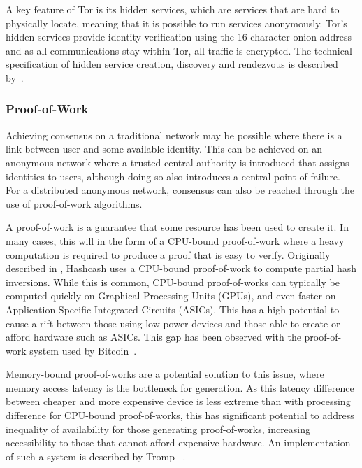 			A key feature of Tor is its hidden services, which are services that are hard to physically locate, meaning that it is possible to run services anonymously. Tor's hidden services provide identity verification using the 16 character onion address and as all communications stay within Tor, all traffic is encrypted. The technical specification of hidden service creation, discovery and rendezvous is described by~\cite{tor_rend}.
			
		\subsubsection*{Proof-of-Work}
			Achieving consensus on a traditional network may be possible where there is a link between user and some available identity. This can be achieved on an anonymous network where a trusted central authority is introduced that assigns identities to users, although doing so also introduces a central point of failure. For a distributed anonymous network, consensus can also be reached through the use of proof-of-work algorithms.
			
			A proof-of-work is a guarantee that some resource has been used to create it. In many cases, this will in the form of a CPU-bound proof-of-work where a heavy computation is required to produce a proof that is easy to verify. Originally described in \cite{back2002hashcash}, Hashcash uses a CPU-bound proof-of-work to compute partial hash inversions. While this is common, CPU-bound proof-of-works can typically be computed quickly on Graphical Processing Units (GPUs), and even faster on Application Specific Integrated Circuits (ASICs). This has a high potential to cause a rift between those using low power devices and those able to create or afford hardware such as ASICs. This gap has been observed with the proof-of-work system used by Bitcoin~\cite{peck2013bitcoin}.
			
			Memory-bound proof-of-works are a potential solution to this issue, where memory access latency is the bottleneck for generation. As this latency difference between cheaper and more expensive device is less extreme than with processing difference for CPU-bound proof-of-works, this has significant potential to address inequality of availability for those generating proof-of-works, increasing accessibility to those that cannot afford expensive hardware. An implementation of such a system is described by Tromp ~\cite{cuckoo}.

